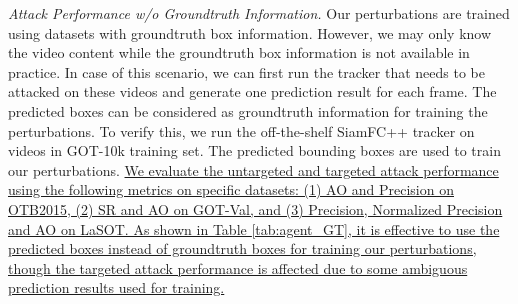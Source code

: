 \documentclass[journal]{IEEEtran}
\begin{document}
\textit{Attack Performance w/o Groundtruth Information.} Our perturbations are trained using datasets with groundtruth box information.
However, we may only know the video content while the groundtruth box information is not available in practice. In case of this scenario, we can first run the tracker that needs to be attacked on these videos and generate one prediction result for each frame. The predicted boxes can be considered as groundtruth information for training the perturbations. To verify this, we run the off-the-shelf SiamFC++ tracker on videos in GOT-10k training set. The predicted bounding boxes are used to train our perturbations.
\uline{We evaluate the untargeted and targeted attack performance using the following metrics on specific datasets: (1) AO and Precision on OTB2015, (2) SR and AO on GOT-Val, and (3) Precision, Normalized Precision and AO on LaSOT. As shown in Table \ref{tab:agent_GT}, it is effective to use the predicted boxes instead of groundtruth boxes for training our perturbations, though the targeted attack performance is affected due to some ambiguous prediction results used for training. 
}
\end{document}
